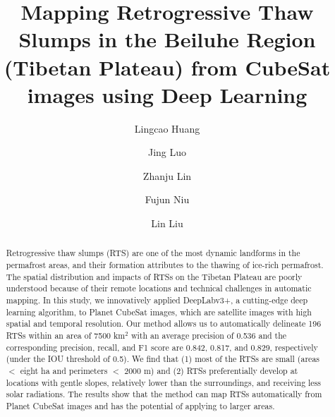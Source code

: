 \documentclass[preprint,12pt,authoryear]{elsarticle}
\begin{document}
\begin{frontmatter}




\title{Mapping Retrogressive Thaw Slumps in the Beiluhe Region (Tibetan Plateau) from CubeSat images using Deep Learning}


\author[a]{Lingcao Huang}
\author[b]{Jing Luo}
\author[b]{Zhanju Lin}
\author[b]{Fujun Niu}
\author[a]{Lin Liu}


\address[a]{Earth System Science Programme, Faculty of Science, The Chinese University of Hong Kong, Hong Kong SAR, China.}
\address[b]{Northwest Institute of Eco-Environment and Resources, Chinese Academy of Sciences, LanZhou, China.}

\begin{abstract}

Retrogressive thaw slumps (RTS) are one of the most dynamic landforms in the permafrost areas, and their formation attributes to the thawing of ice-rich permafrost. The spatial distribution and impacts of RTSs on the Tibetan Plateau are poorly understood because of their remote locations and technical challenges in automatic mapping. In this study, we innovatively applied DeepLabv3+, a cutting-edge deep learning algorithm, to Planet CubeSat images, which are satellite images with high spatial and temporal resolution.  Our method allows us to automatically delineate 196 RTSs within an area of 7500 km$^2$ with an average precision of 0.536 and the corresponding precision, recall, and F1 score are 0.842, 0.817, and 0.829, respectively (under the IOU threshold of 0.5). We find that (1) most of the RTSs are small (areas $<$ eight ha and perimeters $<$ 2000 m)  and (2) RTSs preferentially develop at locations with gentle slopes, relatively lower than the surroundings, and receiving less solar radiations. The results show that the method can map RTSs automatically from Planet CubeSat images and has the potential of applying to larger areas.



\end{abstract}
\end{frontmatter}
\end{document}
